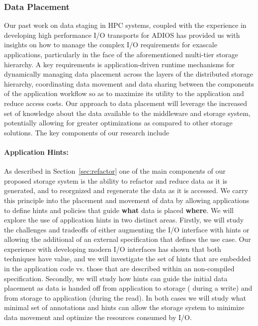 \subsubsection{Data Placement}
\label{sec:data-placement}

Our past work on data
staging\cite{tongipdps15,qiansc15}\cite{docan2012dataspaces}\cite{abbasi2010datastager}
in HPC systems, coupled with the experience in developing high performance
I/O transports for ADIOS \cite{liu2014hello,lofstead2008flexible} has
provided us with insights on how to manage the complex I/O requirements for
exascale applications, particularly in the face of the aforementioned
multi-tier storage hierarchy. A key requirements is application-driven
%
runtime mechanisms for dynamically managing data placement across the layers
of the distributed storage hierarchy,
%
coordinating data movement 
%
and data sharing between the components of the application workflow so as to
maximize its utility to the application and reduce access costs. Our
approach to data placement will leverage the increased set of knowledge
about the data available to the middleware and storage system, potentially
allowing for greater optimizations as compared to other storage solutions. 
The key components of our research include

\paragraph{Application Hints:}
As described in Section~\ref{sec:refactor} one of the main components of our
proposed storage system is the ability to refactor and reduce data as it is
generated, and to reorgnized and regenerate the data as it is accessed. We
carry this principle into the placement and movement of data by allowing
applications to define hints and policies that guide \textbf{what} data is
placed \textbf{where}. We will explore the use of application hints in two
distinct areas. Firstly, we will study the challenges and tradeoffs of either
augmenting the I/O interface with hints or allowing the additional of an
external specification that defines the use case. Our experience with
developing modern I/O interfaces has shown that both techniques have value,
and we will investigate the set of hints that are embedded in the
application code vs. those that are described within an non-compiled
specification. Secondly, we will study how hints can guide the initial data
placement as data is handed off from application to storage ( during a
write) and from storage to application (during the read). In both cases we
will study what minimal set of annotations and hints can allow the storage
system to minimize data movement and optimize the resources consumed by I/O. 


